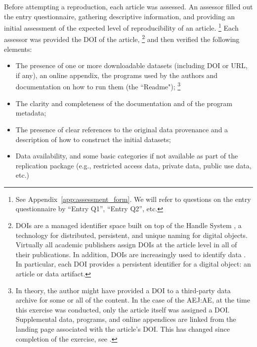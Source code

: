 \documentclass{cje} %
\theoremstyle{plain}%
\theoremstyle{definition}
\theoremstyle{remark}
\begin{document}
Before attempting a reproduction, each article was assessed.
An assessor filled out the entry questionnaire, gathering descriptive information,  and providing an initial assessment of the expected level of reproducibility of an article.%
%
\footnote{See Appendix~\ref{app:assessment_form}. We will refer to questions on the entry questionnaire by ``Entry Q1'', ``Entry Q2'', etc.}
%
Each assessor was provided the  \ac{DOI} of the article,%
%
\footnote{\acp{DOI} are a managed identifier space built on top of the Handle System \citep{Handle}, a technology for distributed, persistent, and unique naming for digital objects. Virtually all academic publishers assign \acp{DOI} at the article level in all of their publications. In addition, \acp{DOI} are increasingly used to identify data \citep{PollardWilkinson2010}. In particular, each \ac{DOI} provides a persistent identifier \citep{DOI2012} for a digital object: an article or data artifact.}
%
and then verified the following elements:
\begin{itemize}
\item
The presence of one or more downloadable datasets (including \ac{DOI} or URL, if any), an online appendix, the programs used by the authors and documentation on how to run them (the ``Readme");%
%
 \footnote{In theory, the author might have provided a \ac{DOI} to a third-party data archive for some or all of the content. 
 	In the case of the \ac{AEJ:AE}, at the time this exercise was conducted, only the article itself was assigned a \ac{DOI}. Supplemental data, programs, and online appendices are linked from the landing page associated with the article's \ac{DOI}. This has changed since completion of the exercise, see \cite{VilhuberAEAPap.Proc.2020}.}
 \item
 The clarity and completeness of the documentation and of the program metadata;
 \item
 The presence of clear references to the original data provenance and a description of how to construct the initial datasets;

 \item
 Data availability, and some basic categories if not available as part of the replication package (e.g., restricted access data, private data, public use data, etc.)
 \end{itemize}
\end{document}
